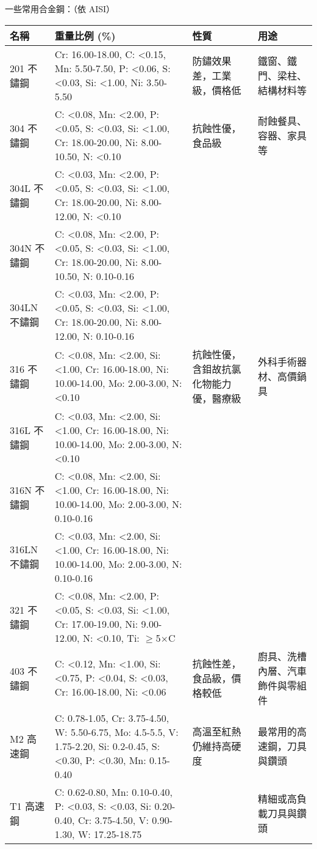 \documentclass[a4paper,12pt]{report}
\begin{document}
\begin{itemize}
一些常用合金鋼：（依 AISI）
\begin{longtable}[c]{|p{0.15\tw}|p{0.25\tw}|p{0.25\tw}|p{0.15\tw}|}
\hline
名稱 & 重量比例 (\%) & 性質 & 用途 \\\hline\endhead
201 不鏽鋼 & Cr: 16.00-18.00, C: <0.15, Mn: 5.50-7.50, P: <0.06, S: <0.03, Si: <1.00, Ni: 3.50-5.50 & 防鏽效果差，工業級，價格低 & 鐵窗、鐵門、梁柱、結構材料等 \\\hline
304 不鏽鋼 & C: <0.08, Mn: <2.00, P: <0.05, S: <0.03, Si: <1.00, Cr: 18.00-20.00, Ni: 8.00-10.50, N: <0.10 & 抗蝕性優，食品級 & 耐蝕餐具、容器、家具等 \\\cline{1-2}
304L 不鏽鋼 & C: <0.03, Mn: <2.00, P: <0.05, S: <0.03, Si: <1.00, Cr: 18.00-20.00, Ni: 8.00-12.00, N: <0.10 & & \\\cline{1-2}
304N 不鏽鋼 & C: <0.08, Mn: <2.00, P: <0.05, S: <0.03, Si: <1.00, Cr: 18.00-20.00, Ni: 8.00-10.50, N: 0.10-0.16 & & \\\cline{1-2}
304LN 不鏽鋼 & C: <0.03, Mn: <2.00, P: <0.05, S: <0.03, Si: <1.00, Cr: 18.00-20.00, Ni: 8.00-12.00, N: 0.10-0.16 & & \\\hline
316 不鏽鋼 & C: <0.08, Mn: <2.00, Si: <1.00, Cr: 16.00-18.00, Ni: 10.00-14.00, Mo: 2.00-3.00, N: <0.10 & 抗蝕性優，含鉬故抗氯化物能力優，醫療級 & 外科手術器材、高價鍋具 \\\cline{1-2}
316L 不鏽鋼 & C: <0.03, Mn: <2.00, Si: <1.00, Cr: 16.00-18.00, Ni: 10.00-14.00, Mo: 2.00-3.00, N: <0.10 & & \\\cline{1-2}
316N 不鏽鋼 & C: <0.08, Mn: <2.00, Si: <1.00, Cr: 16.00-18.00, Ni: 10.00-14.00, Mo: 2.00-3.00, N: 0.10-0.16 & & \\\cline{1-2}
316LN 不鏽鋼 & C: <0.03, Mn: <2.00, Si: <1.00, Cr: 16.00-18.00, Ni: 10.00-14.00, Mo: 2.00-3.00, N: 0.10-0.16 & & \\\hline
321 不鏽鋼 & C: <0.08, Mn: <2.00, P: <0.05, S: <0.03, Si: <1.00, Cr: 17.00-19.00, Ni: 9.00-12.00, N: <0.10, Ti: $\geq$5$\times$C & & \\\hline
403 不鏽鋼 & C: <0.12, Mn: <1.00, Si: <0.75, P: <0.04, S: <0.03, Cr: 16.00-18.00, Ni: <0.06 & 抗蝕性差，食品級，價格較低 & 廚具、洗槽內層、汽車飾件與零組件 \\\hline
M2 高速鋼 & C: 0.78-1.05, Cr: 3.75-4.50, W: 5.50-6.75, Mo: 4.5-5.5, V: 1.75-2.20, Si: 0.2-0.45, S: <0.30, P: <0.30, Mn: 0.15-0.40 & 高溫至紅熱仍維持高硬度 & 最常用的高速鋼，刀具與鑽頭 \\\cline{1-2}\cline{3-4}
T1 高速鋼 & C: 0.62-0.80, Mn: 0.10-0.40, P: <0.03, S: <0.03, Si: 0.20-0.40, Cr: 3.75-4.50, V: 0.90-1.30, W: 17.25-18.75 & & 精細或高負載刀具與鑽頭 \\\cline{1-2}\cline{3-4}

\end{longtable}
\end{itemize}
\end{document}
